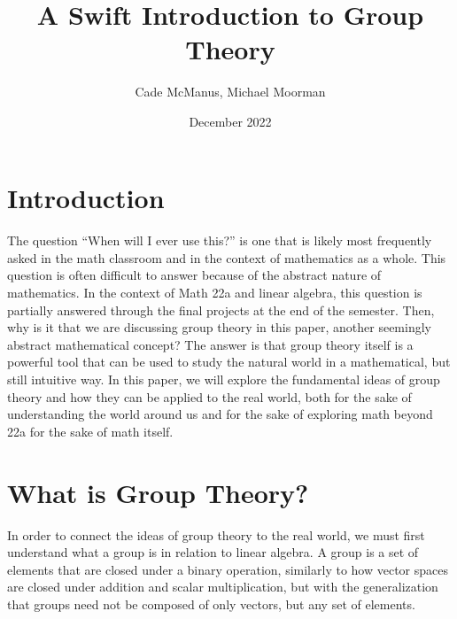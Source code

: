 \documentclass[twoside]{article}
\title{\textbf{A Swift Introduction to Group Theory}}
\author{Cade McManus, Michael Moorman}
\date{December 2022}
\begin{document}
\pagestyle{fancy}
\fancyhf{}
\renewcommand{\headrulewidth}{.7pt}
\fancyfoot[C]{\thepage\ }


\maketitle

\section{Introduction}

\paragraph*{} The question ``When will I ever use this?'' is one that is likely 
most frequently asked in the math classroom and in the context of mathematics 
as a whole. This question is often difficult to answer because 
of the abstract nature of mathematics. In the context of Math 22a and linear 
algebra, this question is partially answered through the final projects 
at the end of the semester. Then, why is it that we are discussing group theory 
in this paper,
another seemingly abstract mathematical concept? The answer is that group theory
itself is a powerful tool that can be used to study the natural world in a 
mathematical, but still intuitive way. In this paper, we will explore the
fundamental ideas of group theory and how they can be applied to the real world,
both for the sake of understanding the world around us and for the sake of
exploring math beyond 22a for the sake of math itself. 

\section{What is Group Theory?}

In order to connect the ideas of group theory to the real world, we must first understand what a group is 
in relation to linear algebra. A group is a set of elements that are closed under a binary operation,
similarly to how vector spaces are closed under addition and scalar multiplication, but with the 
generalization that groups need not be composed of only vectors, but any set of elements.
\end{document}
